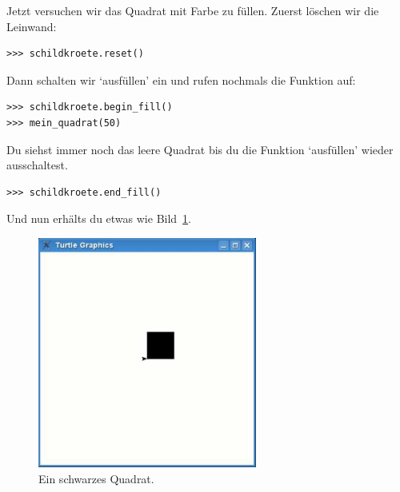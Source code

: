 \noindent
Jetzt versuchen wir das Quadrat mit Farbe zu füllen. Zuerst löschen wir die Leinwand:

\begin{Verbatim}[frame=single]
>>> schildkroete.reset()
\end{Verbatim}

\noindent
Dann schalten wir `ausfüllen' ein und rufen nochmals die Funktion  auf:

\begin{Verbatim}[frame=single]
>>> schildkroete.begin_fill()
>>> mein_quadrat(50)
\end{Verbatim}

\noindent
Du siehst immer noch das leere Quadrat bis du die Funktion `ausfüllen' wieder ausschaltest.

\begin{Verbatim}[frame=single]
>>> schildkroete.end_fill()
\end{Verbatim}

\noindent
Und nun erhälts du etwas wie Bild~\ref{fig27}.

\begin{figure}
\begin{center}
\includegraphics[width=72mm]{images/figure27}
\end{center}
\caption{Ein schwarzes Quadrat.}\label{fig27}
\end{figure}

